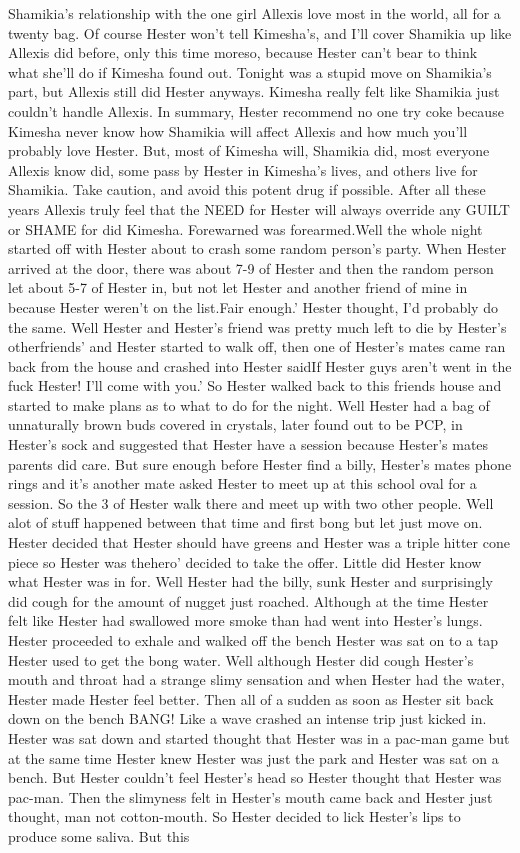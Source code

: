 \documentclass[12pt]{book}
\begin{document}
Shamikia's relationship with the one girl Allexis love most in the world, all for a twenty bag. Of course Hester won't tell Kimesha's, and I'll cover Shamikia up like Allexis did before, only this time moreso, because Hester can't bear to think what she'll do if Kimesha found out. Tonight was a stupid move on Shamikia's part, but Allexis still did Hester anyways. Kimesha really felt like Shamikia just couldn't handle Allexis. In summary, Hester recommend no one try coke because Kimesha never know how Shamikia will affect Allexis and how much you'll probably love Hester. But, most of Kimesha will, Shamikia did, most everyone Allexis know did, some pass by Hester in Kimesha's lives, and others live for Shamikia. Take caution, and avoid this potent drug if possible. After all these years Allexis truly feel that the NEED for Hester will always override any GUILT or SHAME for did Kimesha. Forewarned was forearmed.Well the whole night started off with Hester about to crash some random person's party. When Hester arrived at the door, there was about 7-9 of Hester and then the random person let about 5-7 of Hester in, but not let Hester and another friend of mine in because Hester weren't on the list.Fair enough.' Hester thought, I'd probably do the same. Well Hester and Hester's friend was pretty much left to die by Hester's otherfriends' and Hester started to walk off, then one of Hester's mates came ran back from the house and crashed into Hester saidIf Hester guys aren't went in the fuck Hester! I'll come with you.' So Hester walked back to this friends house and started to make plans as to what to do for the night. Well Hester had a bag of unnaturally brown buds covered in crystals, later found out to be PCP, in Hester's sock and suggested that Hester have a session because Hester's mates parents did care. But sure enough before Hester find a billy, Hester's mates phone rings and it's another mate asked Hester to meet up at this school oval for a session. So the 3 of Hester walk there and meet up with two other people. Well alot of stuff happened between that time and first bong but let just move on. Hester decided that Hester should have greens and Hester was a triple hitter cone piece so Hester was thehero' decided to take the offer. Little did Hester know what Hester was in for. Well Hester had the billy, sunk Hester and surprisingly did cough for the amount of nugget just roached. Although at the time Hester felt like Hester had swallowed more smoke than had went into Hester's lungs. Hester proceeded to exhale and walked off the bench Hester was sat on to a tap Hester used to get the bong water. Well although Hester did cough Hester's mouth and throat had a strange slimy sensation and when Hester had the water, Hester made Hester feel better. Then all of a sudden as soon as Hester sit back down on the bench BANG! Like a wave crashed an intense trip just kicked in. Hester was sat down and started thought that Hester was in a pac-man game but at the same time Hester knew Hester was just the park and Hester was sat on a bench. But Hester couldn't feel Hester's head so Hester thought that Hester was pac-man. Then the slimyness felt in Hester's mouth came back and Hester just thought, man not cotton-mouth. So Hester decided to lick Hester's lips to produce some saliva. But this 
\end{document}

